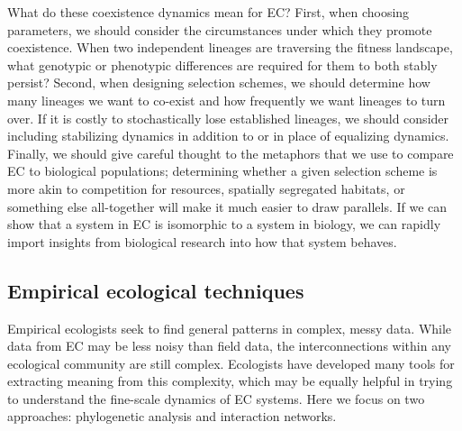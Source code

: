 What do these coexistence dynamics mean for EC? First, when choosing parameters, we should consider the circumstances under which they promote coexistence.  When two independent lineages are traversing the fitness landscape, what genotypic or phenotypic differences are required for them to both stably persist?
Second, when designing selection schemes, we should determine how many lineages we want to co-exist and how frequently we want lineages to turn over.  If it is costly to stochastically lose established lineages, we should consider including stabilizing dynamics in addition to or in place of equalizing dynamics. 
Finally, we should give careful thought to the metaphors that we use to compare EC to biological populations; determining whether a given selection scheme is more akin to competition for resources, spatially segregated habitats, or something else all-together will make it much easier to draw parallels. If we can show that a system in EC is isomorphic to a system in biology, we can rapidly import insights from biological research into how that system behaves.

\subsection{Empirical ecological techniques}

Empirical ecologists seek to find general patterns in complex, messy data. While data from EC may be less noisy than field data, the interconnections within any ecological community are still complex. %
Ecologists have developed many tools for extracting meaning from this complexity, which may be equally helpful in trying to understand the fine-scale dynamics of EC systems. Here we focus on two approaches: phylogenetic analysis and interaction networks.

